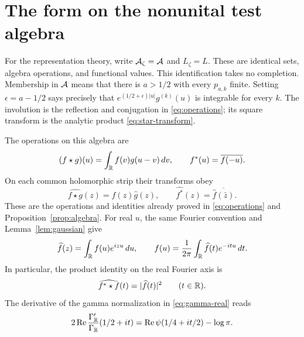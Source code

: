 \section{The form on the nonunital test algebra}
\label{sec:native-form}

For the representation theory, write
$\mathcal A_\zeta=\mathcal A$ and $L_\zeta=L$.
These are identical sets, algebra operations, and functional values.
This identification takes no completion.  Membership in $\mathcal A$ means that there is
$a>1/2$ with every $p_{a,k}$ finite.  Setting $\epsilon=a-1/2$ says precisely
that $e^{(1/2+\epsilon)|u|}g^{(k)}(u)$ is integrable for every $k$.
The involution is the reflection and conjugation in
\eqref{eq:operations}; its square transform is the analytic product
\eqref{eq:star-transform}.

The operations on this algebra are
\begin{equation}
 (f\star g)(u)=\int_{\mathbb R}f(v)g(u-v)\,dv,
 \qquad f^*(u)=\overline{f(-u)}.
 \label{eq:conv}
\end{equation}
On each common holomorphic strip their transforms obey
\begin{equation}
 \widehat{f\star g}(z)=\widehat f(z)\widehat g(z),
 \qquad\widehat{f^*}(z)=\overline{\widehat f(\bar z)}.
 \label{eq:transform}
\end{equation}
These are the operations and identities already proved in
\eqref{eq:operations} and Proposition~\ref{prop:algebra}.
For real $u$, the same Fourier convention and Lemma~\ref{lem:gaussian} give
\begin{equation}
 \widehat f(z)=\int_{\mathbb R}f(u)e^{izu}\,du,
 \qquad f(u)=\frac1{2\pi}\int_{\mathbb R}\widehat f(t)e^{-itu}\,dt.
 \label{eq:fourier}
\end{equation}
In particular, the product identity on the real Fourier axis is
\begin{equation}
 \widehat{f^*\star f}(t)=|\widehat f(t)|^2\qquad(t\in\mathbb R).
 \label{eq:square-transform}
\end{equation}
The derivative of the gamma normalization in \eqref{eq:gamma-real} reads
\begin{equation}
 2\operatorname{Re}\frac{\Gamma_{\mathbb R}'}{\Gamma_{\mathbb R}}(1/2+it)
 =\operatorname{Re}\psi(1/4+it/2)-\log\pi.
 \label{eq:gamma-normalization}
\end{equation}

